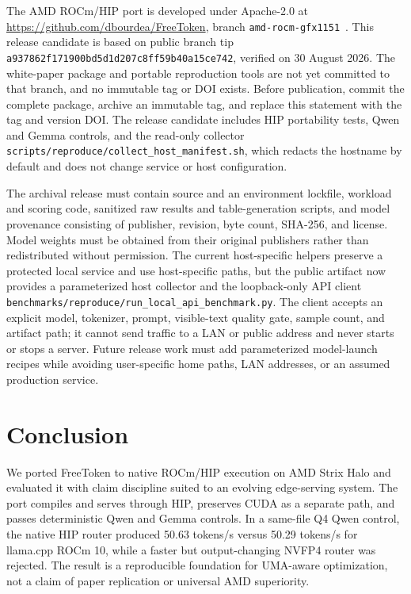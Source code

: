 \documentclass[10pt,letterpaper,twocolumn]{article}
\begin{document}
The AMD ROCm/HIP port is developed under Apache-2.0 at \url{https://github.com/dbourdea/FreeToken}, branch \texttt{amd-rocm-gfx1151}~\cite{freetokenamd,apache}. This release candidate is based on public branch tip \texttt{a937862f171900bd5d1d207c8ff59b40a15ce742}, verified on 30 August 2026. The white-paper package and portable reproduction tools are not yet committed to that branch, and no immutable tag or DOI exists. Before publication, commit the complete package, archive an immutable tag, and replace this statement with the tag and version DOI. The release candidate includes HIP portability tests, Qwen and Gemma controls, and the read-only collector \texttt{scripts/reproduce/collect\_host\_manifest.sh}, which redacts the hostname by default and does not change service or host configuration.

The archival release must contain source and an environment lockfile, workload and scoring code, sanitized raw results and table-generation scripts, and model provenance consisting of publisher, revision, byte count, SHA-256, and license. Model weights must be obtained from their original publishers rather than redistributed without permission. The current host-specific helpers preserve a protected local service and use host-specific paths, but the public artifact now provides a parameterized host collector and the loopback-only API client \texttt{benchmarks/reproduce/run\_local\_api\_benchmark.py}. The client accepts an explicit model, tokenizer, prompt, visible-text quality gate, sample count, and artifact path; it cannot send traffic to a LAN or public address and never starts or stops a server. Future release work must add parameterized model-launch recipes while avoiding user-specific home paths, LAN addresses, or an assumed production service.


\section{Conclusion}

We ported FreeToken to native ROCm/HIP execution on AMD Strix Halo and evaluated it with claim discipline suited to an evolving edge-serving system. The port compiles and serves through HIP, preserves CUDA as a separate path, and passes deterministic Qwen and Gemma controls. In a same-file Q4 Qwen control, the native HIP router produced 50.63 tokens/s versus 50.29 tokens/s for llama.cpp ROCm 10, while a faster but output-changing NVFP4 router was rejected. The result is a reproducible foundation for UMA-aware optimization, not a claim of paper replication or universal AMD superiority.



\end{document}
